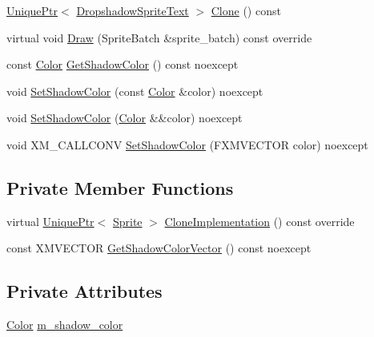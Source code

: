 \begin{DoxyCompactItemize}
\item 
\hyperlink{namespacemage_a3316d7143a973e37adf1110f2e80ca31}{Unique\+Ptr}$<$ \hyperlink{classmage_1_1_dropshadow_sprite_text}{Dropshadow\+Sprite\+Text} $>$ \hyperlink{classmage_1_1_dropshadow_sprite_text_a0dcce82b4a83fbd469d68adba21af220}{Clone} () const
\item 
virtual void \hyperlink{classmage_1_1_dropshadow_sprite_text_af76422c9812d7dc38e9b98e587103c67}{Draw} (Sprite\+Batch \&sprite\+\_\+batch) const override
\item 
const \hyperlink{structmage_1_1_color}{Color} \hyperlink{classmage_1_1_dropshadow_sprite_text_a5aebe32b778feb5e4f82ff11fbc4636f}{Get\+Shadow\+Color} () const noexcept
\item 
void \hyperlink{classmage_1_1_dropshadow_sprite_text_a2aceed81bffc3b6f51cf40bea0eb8405}{Set\+Shadow\+Color} (const \hyperlink{structmage_1_1_color}{Color} \&color) noexcept
\item 
void \hyperlink{classmage_1_1_dropshadow_sprite_text_aa05c94ba64df31046dbdfa3d4d0fdaeb}{Set\+Shadow\+Color} (\hyperlink{structmage_1_1_color}{Color} \&\&color) noexcept
\item 
void X\+M\+\_\+\+C\+A\+L\+L\+C\+O\+NV \hyperlink{classmage_1_1_dropshadow_sprite_text_a87dd66597ce516d139196d1ce26cb680}{Set\+Shadow\+Color} (F\+X\+M\+V\+E\+C\+T\+OR color) noexcept
\end{DoxyCompactItemize}
\subsection*{Private Member Functions}
\begin{DoxyCompactItemize}
\item 
virtual \hyperlink{namespacemage_a3316d7143a973e37adf1110f2e80ca31}{Unique\+Ptr}$<$ \hyperlink{classmage_1_1_sprite}{Sprite} $>$ \hyperlink{classmage_1_1_dropshadow_sprite_text_af997217dd243061e0490bbcd4bfde7ed}{Clone\+Implementation} () const override
\item 
const X\+M\+V\+E\+C\+T\+OR \hyperlink{classmage_1_1_dropshadow_sprite_text_aedbd1adb15584680abebab3784905834}{Get\+Shadow\+Color\+Vector} () const noexcept
\end{DoxyCompactItemize}
\subsection*{Private Attributes}
\begin{DoxyCompactItemize}
\item 
\hyperlink{structmage_1_1_color}{Color} \hyperlink{classmage_1_1_dropshadow_sprite_text_a6343fd2b2b2139d8a869c29a2a33531f}{m\+\_\+shadow\+\_\+color}
\end{DoxyCompactItemize}
